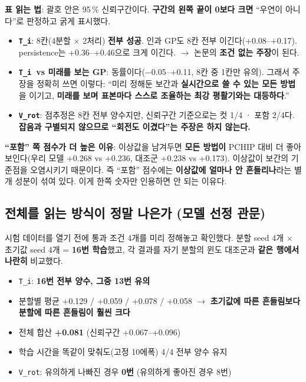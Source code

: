 \documentclass[10pt]{article}
\newcommand{\Ti}{\texttt{T\_i}}
\newcommand{\Vrot}{\texttt{V\_rot}}
\begin{document}
\textbf{표 읽는 법}: 괄호 안은 95\,\% 신뢰구간이다. \textbf{구간의 왼쪽 끝이 0보다 크면}
``우연이 아니다''로 판정하고 굵게 표시했다.

\begin{itemize}
\item \textbf{\Ti}: 8칸(4분할 $\times$ 2처리) \textbf{전부 성공}. 인과 GP도 8칸 전부
  이긴다(+0.08--+0.17). persistence는 +0.36--+0.46으로 크게 이긴다.
  $\rightarrow$ 논문의 \textbf{조건 없는 주장}이 된다.
\item \textbf{\Ti\ vs 미래를 보는 GP}: 동률이다($-$0.05--+0.11, 8칸 중 1칸만 유의).
  그래서 주장을 정확히 쓰면 이렇다: ``미리 정해둔 보간과 \textbf{실시간으로 쓸 수 있는 모든
  방법}을 이기고, \textbf{미래를 보며 표본마다 스스로 조율하는 최강 평활기와는 대등하다}.''
\item \textbf{\Vrot}: 점추정은 8칸 전부 양수지만, 신뢰구간 기준으로는 컷 1/4 · 포함 2/4다.
  \textbf{잡음과 구별되지 않으므로 ``회전도 이겼다''는 주장은 하지 않는다.}
\end{itemize}

\textbf{``포함'' 쪽 점수가 더 높은 이유}: 이상값을 남겨두면 \textbf{모든 방법이} PCHIP 대비
더 좋아 보인다(우리 모델 +0.268 vs +0.236, 대조군 +0.238 vs +0.173). 이상값이 보간의
기준점을 오염시키기 때문이다. 즉 ``포함'' 점수에는 \textbf{이상값에 얼마나 안 흔들리나}라는
별개 성분이 섞여 있다. 이게 한쪽 숫자만 인용하면 안 되는 이유다.

\subsection{전체를 읽는 방식이 정말 나은가 (모델 선정 관문)}
\label{sec:gate}

시험 데이터를 열기 전에 통과 조건 4개를 미리 정해놓고 확인했다. 분할 seed 4개 $\times$
초기값 seed 4개 = \textbf{16번 학습}했고, 각 결과를 자기 분할의 윈도 대조군과 \textbf{같은
행에서 나란히} 비교했다.

\begin{itemize}
\item \Ti: \textbf{16번 전부 양수, 그중 13번 유의}
\item 분할별 평균 +0.129 / +0.059 / +0.078 / +0.058 $\rightarrow$ \textbf{초기값에 따른
  흔들림보다 분할에 따른 흔들림이 훨씬 크다}
\item 전체 합산 \textbf{+0.081} (신뢰구간 +0.067--+0.096)
\item 학습 시간을 똑같이 맞춰도(고정 10에폭) 4/4 전부 양수 유지
\item \Vrot: 유의하게 나빠진 경우 \textbf{0번} (유의하게 좋아진 경우 8번)
\end{itemize}
\end{document}

